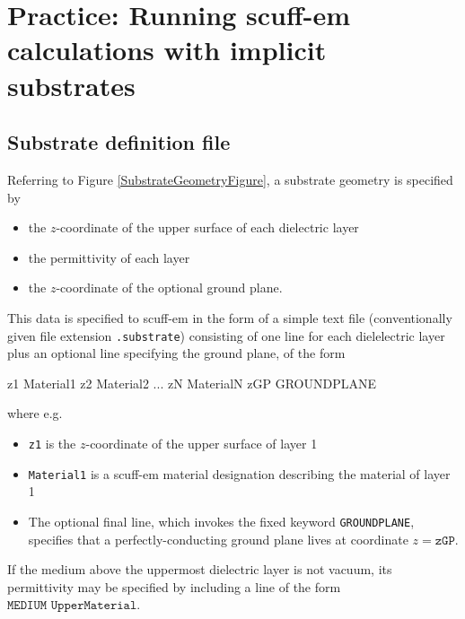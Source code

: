 \documentclass[letterpaper]{article}
\begin{document}
\newpage
\section{Practice: Running {\sc scuff-em} calculations
         with implicit substrates}
\label{ImplementationSection}

\subsection{Substrate definition file}

Referring to Figure \ref{SubstrateGeometryFigure},
a substrate geometry is specified by
\begin{itemize}
 \item the $z$-coordinate of the upper surface of each dielectric layer
 \item the permittivity of each layer
 \item the $z$-coordinate of the optional ground plane.
\end{itemize}

This data is specified to {\sc scuff-em} in the
form of a simple text file (conventionally given file
extension \texttt{.substrate}) consisting of one line for each
dielelectric layer plus an optional line specifying the ground 
plane, of the form

\medskip

\begin{verbcode}
z1  Material1
z2  Material2
...
zN  MaterialN
zGP GROUNDPLANE
\end{verbcode}

\medskip

where e.g.
\begin{itemize}
 \item \texttt{z1} is the $z$-coordinate of the upper surface of
       layer 1
 \item \texttt{Material1} is a {\sc scuff-em} material designation
       describing the material of layer 1
 \item The optional 
       final line, which invokes the fixed keyword \texttt{GROUNDPLANE},
       specifies that a perfectly-conducting ground plane lives at 
       coordinate $z=\texttt{zGP}$.
\end{itemize}
If the medium above the uppermost dielectric layer is not vacuum,
its permittivity may be specified by including a line of the form
$\texttt{MEDIUM UpperMaterial}.$
\end{document}

